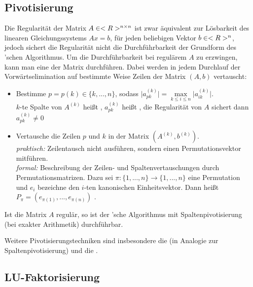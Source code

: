 \subsection{Pivotisierung}

Die Regularität der Matrix $A\in<R>^{n\times n}$ ist zwar äquivalent zur Lösbarkeit des linearen Gleichungssystems $Ax=b$, für jeden beliebigen Vektor $b\in<R>^n$, jedoch sichert die Regularität nicht die Durchführbarkeit der Grundform des 'schen Algorithmus. Um die Durchführbarkeit bei regulärem $A$ zu erzwingen, kann man eine  der Matrix durchführen. Dabei werden in jedem Durchlauf der Vorwärtselimination auf bestimmte Weise Zeilen der Matrix $(A,b)$ vertauscht:
\begin{itemize}
	\item Bestimme $p=p(k)\in\{k,...,n\}$, sodass $\vert a_{pk}^{(k)} \vert =\max\limits_{k\le i\le n}\vert a_{ik}^{(k)}\vert$. \\
	$k$-te Spalte von $A^{(k)}$ heißt , $a_{pk}^{(k)}$ heißt , die Regularität von $A$ sichert dann $a_{pk}^{(k)}\neq 0$
	\item Vertausche die Zeilen $p$ und $k$ in der Matrix $(A^{(k)},b^{(k)})$. \\
	\emph{praktisch:} Zeilentausch nicht ausführen, sondern einen Permutationsvektor mitführen. \\
	\emph{formal:} Beschreibung der Zeilen- und Spaltenvertauschungen durch Permutationsmatrizen. Dazu sei $\pi:\{1,...,n\}\to\{1,...,n\}$ eine Permutation und $e_i$ bezeichne den $i$-ten kanonischen Einheitsvektor. Dann heißt $P_\pi=(e_{\pi(1)},...,e_{\pi(n)})$ .
\end{itemize}

\begin{proposition}
	Ist die Matrix $A$ regulär, so ist der 'sche Algorithmus mit Spaltenpivotisierung (bei exakter Arithmetik) durchführbar.
\end{proposition}

Weitere Pivotisierungstechniken sind insbesondere die  (in Analogie zur Spaltenpivotisierung) und die .

\subsection{LU-Faktorisierung}

